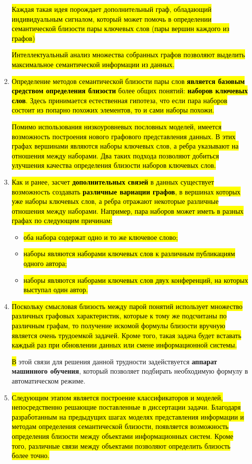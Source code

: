 \begin{enumerate}
        \hl{Каждая такая идея порождает дополнительный граф, обладающий индивидуальным сигналом, который может помочь в определении семантической близости пары ключевых слов (пары вершин каждого из графов)}

        \hl{Интеллектуальный анализ множества собранных графов позволяют выделить максимальное семантической информации из данных.}

    \item \hl{Определение методов семантической близости пары слов \textbf{является базовым средством определения близости} более общих понятий: \textbf{наборов ключевых слов}. Здесь принимается естественная гипотеза, что если пара наборов состоит из попарно похожих элементов, то и сами наборы похожи. }
        
            \hl{Помимо использования низкоуровневых пословных моделей, имеется возможность построения нового графового представления данных. В этих графах вершинами являются наборы ключевых слов, а ребра указывают на отношения между наборами. Два таких подхода позволяют добиться улучшения качества определения близости наборов ключевых слов.}

        \item \hl{Как и ранее, засчет \textbf{дополнительных связей} в данных существует возможность создавать \textbf{различные вариации графов}, в вершинах которых уже наборы ключевых слов, а ребра отражают некоторые различные отношения между наборами. Например, пара наборов может иметь в разных графах по следующим причинам:}
        \begin{itemize}
            \item \hl{оба набора содержат одно и то же ключевое слово;}
            \item \hl{наборы являются наборами ключевых слов к различным публикациям одного автора;}
            \item \hl{наборы являются наборами ключевых слов двух конференций, на которых выступал один автор.}
        \end{itemize}
    \item \hl{Поскольку смысловая близость между парой понятий использует множество различных графовых характеристик, которые к тому же подсчитаны по различным графам, то получение искомой формулы близости вручную является очень трудоемкой задачей. Кроме того, такая задача будет вставать каждый раз при обновлении данных или смене информационной системы.}

           \hl В этой связи для решения данной трудности задействуется \textbf{аппарат машинного обучения}, который позволяет подбирать необходимую формулу в автоматическом режиме.

    \item \hl{Следующим этапом является построение классификаторов и моделей, непосредственно решающие поставленные в диссертации задачи. Благодаря разработанным на предыдущих шагах моделях представления информации и методам определения семантической близости, появляется возможность определения близости между объектами информационных систем. Кроме того, различные связи между объектами позволяют определить близость более точно.}
\end{enumerate}
